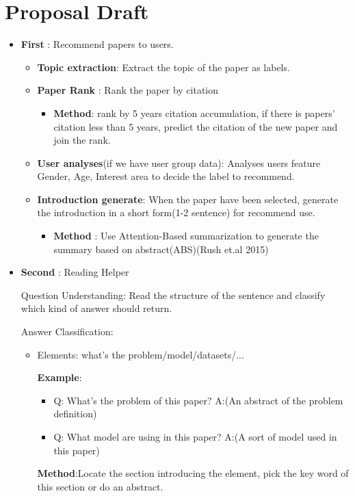 \section{Proposal Draft}
\begin{itemize}
\item \textbf{First} : Recommend papers to users.
\begin{itemize}
\item \textbf{Topic extraction}: Extract the topic of the paper as labels.
\item \textbf{Paper Rank} : Rank the paper by citation
\begin{itemize}
\item \textbf{Method}: rank by 5 years citation accumulation, if there is papers' citation less than 5 years, predict the citation of the new paper and join the rank.
\end{itemize}
\item \textbf{User analyses}(if we have user group data): Analyses users feature {Gender, Age, Interest area} to decide the label to recommend. 
\item \textbf{Introduction generate}: When the paper have been selected, generate the introduction in a short form(1-2 sentence) for recommend use.
\begin{itemize}
\item \textbf{Method} : Use Attention-Based summarization to generate the summary based on abstract(ABS)(Rush et.al 2015)
\end{itemize}
\end{itemize}
 
\item \textbf{Second} : Reading Helper

Question Understanding: Read the structure of the sentence and classify which kind of answer should return.

Answer Classification:
\begin{itemize}
\item Elements: what's the problem/model/datasets/...

  \textbf{Example}:
  \begin{itemize}
  \item Q: What's the problem of this paper? A:(An abstract of the problem definition)
  \item Q: What model are using in this paper? A:(A sort of model used in this paper)
  \end{itemize}

  \textbf{Method}:Locate the section introducing the element, pick the key word of this section or do an abstract.


\end{itemize}
\end{itemize}
